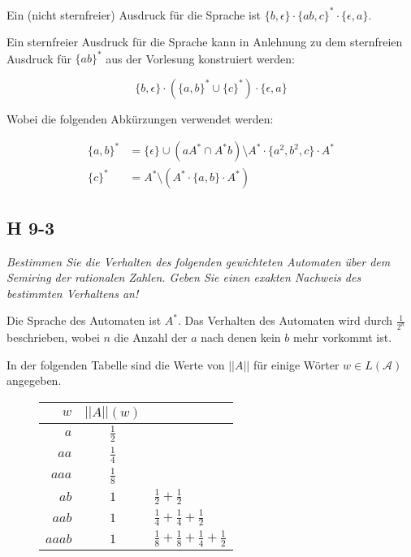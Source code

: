 \documentclass{scrartcl}
\begin{document}
\begin{enumerate}[(a)]
      Ein (nicht sternfreier) Ausdruck für die Sprache ist $\{b, \epsilon\} \cdot \{ab,c\}^* \cdot \{\epsilon, a\}$.

      Ein sternfreier Ausdruck für die Sprache kann in Anlehnung zu dem sternfreien Ausdruck für $\{ab\}^*$ aus der Vorlesung konstruiert werden:

      \begin{equation*}
        \{b, \epsilon\} \cdot (\{a,b\}^* \cup \{c\}^*) \cdot \{\epsilon, a\}
      \end{equation*}

      Wobei die folgenden Abkürzungen verwendet werden:

      \begin{align*}
        \{a,b\}^* &= \{\epsilon\} \cup (aA^* \cap A^*b) \setminus A^* \cdot \{a^2, b^2, c\} \cdot A^*\\
        \{c\}^* &= A^* \setminus (A^* \cdot \{a, b\} \cdot A^*)
      \end{align*}
\end{enumerate}

\subsection{H 9-3}

\textsl{Bestimmen Sie die Verhalten des folgenden gewichteten Automaten über dem \emph{Semiring der rationalen Zahlen}. Geben Sie einen exakten Nachweis des bestimmten Verhaltens an!}

Die Sprache des Automaten ist $A^*$. Das Verhalten des Automaten wird durch $\frac{1}{2^n}$ beschrieben, wobei $n$ die Anzahl der $a$ nach denen kein $b$ mehr vorkommt ist.

In der folgenden Tabelle sind die Werte von $||A||$ für einige Wörter $w \in L(\mathcal{A})$ angegeben.

\begin{figure}[h]
  \centering
  \begin{tabular}{r|c|l}
    $w$   & $||A||(w)$ & \\
    \hline

    $a$    & $\frac{1}{2}$ \\
    $aa$   & $\frac{1}{4}$ \\
    $aaa$  & $\frac{1}{8}$ \\
    $ab$   & $1$           & $\frac{1}{2} + \frac{1}{2}$ \\
    $aab$  & $1$           & $\frac{1}{4} + \frac{1}{4} + \frac{1}{2}$ \\
    $aaab$ & $1$           & $\frac{1}{8} + \frac{1}{8} + \frac{1}{4} + \frac{1}{2}$ \\
  \end{tabular}
\end{figure}
\end{document}
